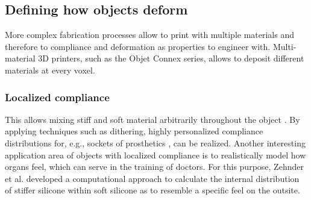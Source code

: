 \subsection{Defining how objects deform}

More complex fabrication processes allow to print with multiple materials and therefore to compliance and deformation as properties to engineer with. Multi-material 3D printers, such as the Objet Connex series, allows to deposit different materials at every voxel. 

\subsubsection{Localized compliance}
This allows mixing stiff and soft material arbitrarily throughout the object \cite{Kou2007}. By applying techniques such as dithering, highly personalized compliance distributions for, e.g., sockets of prosthetics \cite{Doubrovski2015}, can be realized. Another interesting application area of objects with localized compliance is to realistically model how organs feel, which can serve in the training of doctors. For this purpose, Zehnder et al. \cite{Zehnder2017} developed a computational approach to calculate the internal distribution of stiffer silicone within soft silicone as to resemble a specific feel on the outsite.



